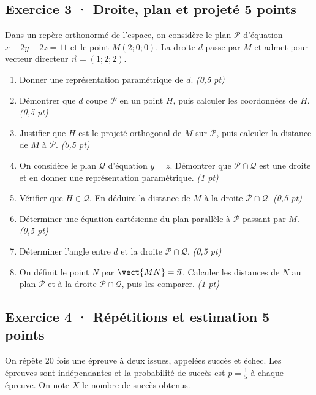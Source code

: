 \subsection*{Exercice 3 · Droite, plan et projeté \hfill 5 points}Dans un repère orthonormé de l'espace, on considère le plan $\mathcal P$ d'équation $x+2y+2z=11$ et le point $M(2;0;0)$. La droite $d$ passe par $M$ et admet pour vecteur directeur $\vec n=(1;2;2)$.

\begin{enumerate}

\item Donner une représentation paramétrique de $d$. \hfill\textit{(0,5 pt)}

\item Démontrer que $d$ coupe $\mathcal P$ en un point $H$, puis calculer les coordonnées de $H$. \hfill\textit{(0,5 pt)}

\item Justifier que $H$ est le projeté orthogonal de $M$ sur $\mathcal P$, puis calculer la distance de $M$ à $\mathcal P$. \hfill\textit{(0,5 pt)}

\item On considère le plan $\mathcal Q$ d'équation $y=z$. Démontrer que $\mathcal P\cap\mathcal Q$ est une droite et en donner une représentation paramétrique. \hfill\textit{(1 pt)}

\item Vérifier que $H\in\mathcal Q$. En déduire la distance de $M$ à la droite $\mathcal P\cap\mathcal Q$. \hfill\textit{(0,5 pt)}

\item Déterminer une équation cartésienne du plan parallèle à $\mathcal P$ passant par $M$. \hfill\textit{(0,5 pt)}

\item Déterminer l'angle entre $d$ et la droite $\mathcal P\cap\mathcal Q$. \hfill\textit{(0,5 pt)}

\item On définit le point $N$ par $\vect{MN}=\vec n$. Calculer les distances de $N$ au plan $\mathcal P$ et à la droite $\mathcal P\cap\mathcal Q$, puis les comparer. \hfill\textit{(1 pt)}

\end{enumerate}

\subsection*{Exercice 4 · Répétitions et estimation \hfill 5 points}On répète $20$ fois une épreuve à deux issues, appelées succès et échec. Les épreuves sont indépendantes et la probabilité de succès est $p=\frac{1}{5}$ à chaque épreuve. On note $X$ le nombre de succès obtenus.

